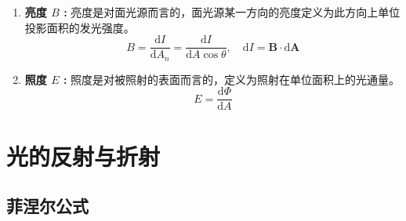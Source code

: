 \documentclass[UTF8]{report}
\theoremstyle{MyLineTheoremStyle} %
\theoremstyle{MyBlockTheoremStyle} %
\theoremstyle{MySubsubsectionStyle} %
\begin{document}
\begin{enumerate}[label=\bfseries(\arabic*)]
\item \textbf{亮度 $B$ :}
亮度是对面光源而言的，面光源某一方向的亮度定义为此方向上单位投影面积的发光强度。
\begin{equation}
B = \frac{\mathrm{d} I}{\mathrm{d} A_n} = \frac{\mathrm{d} I}{\mathrm{d} A \cos \theta},\quad \mathrm{d}I = \boldsymbol{B} \cdot \mathrm{d}\boldsymbol{A}
\end{equation}

\item  \textbf{照度 $E$ :} 
照度是对被照射的表面而言的，定义为照射在单位面积上的光通量。
\begin{equation}
E = \frac{\mathrm{d} \Phi}{\mathrm{d} A}
\end{equation}
\end{enumerate}


\chapter{光的反射与折射}\thispagestyle{fancy}

\section{菲涅尔公式}
\end{document}
